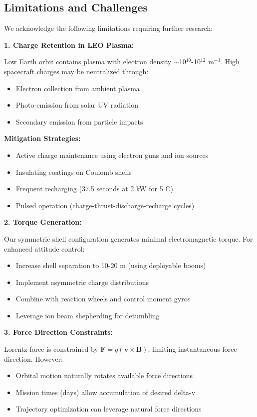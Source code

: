 \documentclass[12pt,a4paper]{article}
\begin{document}
\subsection{Limitations and Challenges}

We acknowledge the following limitations requiring further research:

\textbf{1. Charge Retention in LEO Plasma:}

Low Earth orbit contains plasma with electron density $\sim$10$^{10}$-10$^{12}$ m$^{-3}$. High spacecraft charges may be neutralized through:
\begin{itemize}
\item Electron collection from ambient plasma
\item Photo-emission from solar UV radiation
\item Secondary emission from particle impacts
\end{itemize}

\textbf{Mitigation Strategies:}
\begin{itemize}
\item Active charge maintenance using electron guns and ion sources
\item Insulating coatings on Coulomb shells
\item Frequent recharging (37.5 seconds at 2 kW for 5 C)
\item Pulsed operation (charge-thrust-discharge-recharge cycles)
\end{itemize}

\textbf{2. Torque Generation:}

Our symmetric shell configuration generates minimal electromagnetic torque. For enhanced attitude control:
\begin{itemize}
\item Increase shell separation to 10-20 m (using deployable booms)
\item Implement asymmetric charge distributions
\item Combine with reaction wheels and control moment gyros
\item Leverage ion beam shepherding for detumbling
\end{itemize}

\textbf{3. Force Direction Constraints:}

Lorentz force is constrained by $\mathbf{F} = q(\mathbf{v} \times \mathbf{B})$, limiting instantaneous force direction. However:
\begin{itemize}
\item Orbital motion naturally rotates available force directions
\item Mission times (days) allow accumulation of desired delta-v
\item Trajectory optimization can leverage natural force directions
\end{itemize}
\end{document}
